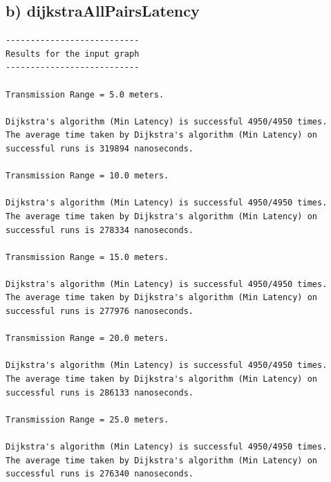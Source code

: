 \documentclass{article}
\begin{document}
\subsection*{b) dijkstraAllPairsLatency}
\begin{verbatim}
---------------------------
Results for the input graph
---------------------------

Transmission Range = 5.0 meters.

Dijkstra's algorithm (Min Latency) is successful 4950/4950 times.
The average time taken by Dijkstra's algorithm (Min Latency) on successful runs is 319894 nanoseconds.

Transmission Range = 10.0 meters.

Dijkstra's algorithm (Min Latency) is successful 4950/4950 times.
The average time taken by Dijkstra's algorithm (Min Latency) on successful runs is 278334 nanoseconds.

Transmission Range = 15.0 meters.

Dijkstra's algorithm (Min Latency) is successful 4950/4950 times.
The average time taken by Dijkstra's algorithm (Min Latency) on successful runs is 277976 nanoseconds.

Transmission Range = 20.0 meters.

Dijkstra's algorithm (Min Latency) is successful 4950/4950 times.
The average time taken by Dijkstra's algorithm (Min Latency) on successful runs is 286133 nanoseconds.

Transmission Range = 25.0 meters.

Dijkstra's algorithm (Min Latency) is successful 4950/4950 times.
The average time taken by Dijkstra's algorithm (Min Latency) on successful runs is 276340 nanoseconds.
\end{verbatim}
\end{document}
